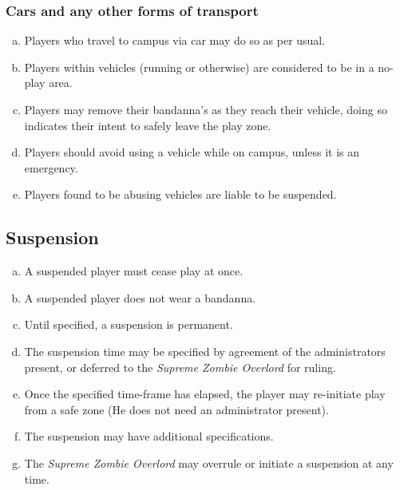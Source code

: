 \documentclass[a4paper,12pt]{article}
\begin{document}
\subsubsection{Cars and any other forms of transport}
\begin{enumerate}[(a)]
    \item Players who travel to campus via car may do so as per usual.
    \item Players within vehicles (running or otherwise) are considered to be in a no-play area.
    \item Players may remove their bandanna's as they reach their vehicle, doing so indicates their intent to safely leave the play zone.
    \item Players should avoid using a vehicle while on campus, unless it is an emergency.
    \item Players found to be abusing vehicles are liable to be suspended.
\end{enumerate}

\subsection{Suspension}

\begin{enumerate}[(a)]
    \item A suspended player must cease play at once.
    \item A suspended player does not wear a bandanna.
    \item Until specified, a suspension is permanent.
    \item The suspension time may be specified by agreement of the administrators present, or deferred to the \emph{Supreme Zombie Overlord} for ruling.
    \item Once the specified time-frame has elapsed, the player may re-initiate play from a safe zone (He does not need an administrator present).
    \item The suspension may have additional specifications.
    \item The \emph{Supreme Zombie Overlord} may overrule or initiate a suspension at any time. 
\end{enumerate}
\end{document}
